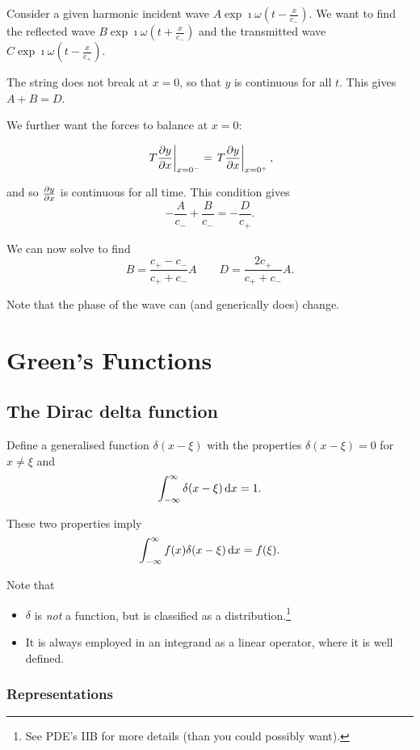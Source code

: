 \documentclass{notes}
\theoremstyle{plain}
\begin{document}
Consider a given harmonic incident wave
$A \exp\imath \omega \left(t - \frac{x}{c_-} \right)$. We want to find
the reflected wave $B \exp\imath \omega \left(t + \frac{x}{c_-}
\right)$ and the transmitted wave $C \exp\imath \omega \left(t - \frac{x}{c_+}
\right)$.

The string does not break at $x=0$, so that $y$ is continuous for all
$t$.  This gives $A+B=D$.

We further want the forces to balance at $x=0$:

\[
\left.T \frac{\partial y}{\partial x}\right|_{x=0^-} = \left.T \frac{\partial y}{\partial x}\right|_{x=0^+},
\]

and so $\frac{\partial y}{\partial x}$ is continuous for all time.  This condition gives
\[
- \frac{A}{c_-} + \frac{B}{c_-} = - \frac{D}{c_+}.
\]

We can now solve to find
\[
B = \frac{c_+ - c_-}{c_+ + c_-} A \qquad D = \frac{2 c_+}{c_+ + c_-} A.
\]

Note that the phase of the wave can (and generically does) change.

\chapter{Green's Functions}

\section{The Dirac delta function}

Define a generalised function $\delta(x-\xi)$ with the properties
$\delta(x-\xi) = 0$ for $x \neq \xi$ and
\[
\int_{-\infty}^\infty \delta(x-\xi)\, \mathrm{d} x = 1.
\]

These two properties imply
\[
\int_{-\infty}^\infty f(x) \delta(x-\xi)\, \mathrm{d} x = f(\xi).
\]

Note that

\begin{itemize}
\item $\delta$ is \emph{not} a function, but is classified as a
  distribution.\footnote{See PDE's IIB for more details (than you could
    possibly want).}
\item It is always employed in an integrand as a linear operator,
  where it is well defined.
\end{itemize}

\subsection{Representations}
\end{document}
